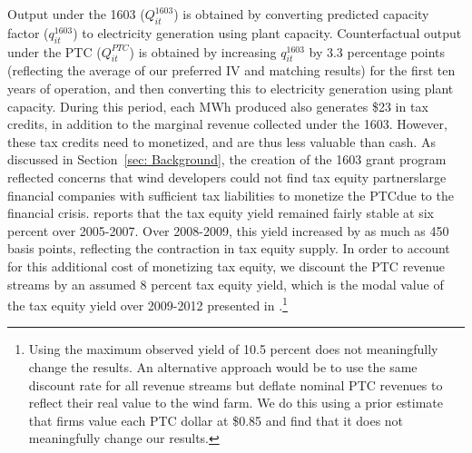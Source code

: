 \documentclass[12pt]{article}
\begin{document}
Output under the 1603 ($Q_{it}^{1603}$) is obtained by converting predicted capacity factor ($q_{it}^{1603}$) to electricity generation using plant capacity. Counterfactual output under the PTC ($Q_{it}^{PTC}$) is obtained by increasing $q_{it}^{1603}$ by 3.3 percentage points (reflecting the average of our preferred IV and matching results) for the first ten years of operation, and then converting this to electricity generation using plant capacity. During this period, each MWh produced also generates \$23 in tax credits, in addition to the marginal revenue collected under the 1603. However, these tax credits need to monetized, and are thus less valuable than cash. As discussed in Section~\ref{sec: Background}, the creation of the 1603 grant program reflected concerns that wind developers could not find tax equity partners\textemdash large financial companies with sufficient tax liabilities to monetize the PTC\textemdash due to the financial crisis. \citet{bolinger_analysis_2014} reports that the tax equity yield remained fairly stable at six percent over 2005-2007. Over 2008-2009, this yield increased by as much as 450 basis points, reflecting the contraction in tax equity supply. In order to account for this additional cost of monetizing tax equity, we discount the PTC revenue streams by an assumed 8 percent tax equity yield, which is the modal value of the tax equity yield over 2009-2012 presented in \citet{bolinger_analysis_2014}.\footnote{Using the maximum observed yield of 10.5 percent does not meaningfully change the results. An alternative approach would be to use the same discount rate for all revenue streams but deflate nominal PTC revenues to reflect their real value to the wind farm. We do this using a prior estimate that firms value each PTC dollar at \$0.85 \citep{johnston_non-refundable_2019} and find that it does not meaningfully change our results.}
\end{document}
